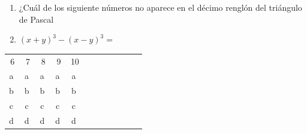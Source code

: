 \documentclass[fleqn]{article}
\begin{document}
\begin{enumerate}
 \item ¿Cuál de los siguiente números no aparece en el décimo renglón del triángulo de Pascal
 \begin{enumerate}
 \end{enumerate}
 \item $(x+y)^{3}-(x-y)^{3}=$
 \begin{enumerate}
 \end{enumerate}
 \end{enumerate}
 \begin{center}
\begin{tabular}{cccccccccccc}
6 & 7 & 8 & 9 & 10 \\ 
\textcircled{a} & \textcircled{a} & \textcircled{a} & \textcircled{a} & \textcircled{a}\\ 
\textcircled{b} & \textcircled{b} & \textcircled{b} & \textcircled{b} & \textcircled{b} \\ 
\textcircled{c} & \textcircled{c} & \textcircled{c} & \textcircled{c} & \textcircled{c}\\ 
\textcircled{d} & \textcircled{d} & \textcircled{d} & \textcircled{d} & \textcircled{d} \\ 
\end{tabular} 
\end{center}
\end{document}
